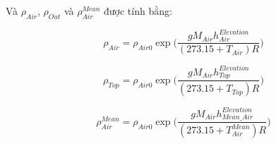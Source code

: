 \documentclass[a4paper]{article}
\begin{document}
Và $\rho_{Air}$, $\rho_{Out}$ và $\rho^{Mean}_{Air}$ được tính bằng:

\begin{equation}\label{rho_air}
\rho_{Air} =  \rho_{Air0}\exp \bigg( \frac{gM_{Air}h^{Elevation}_{Air}}{(273.15+T_{Air})R}\bigg)
\end{equation}

\begin{equation}\label{rho_out}
\rho_{Top} =  \rho_{Air0}\exp \bigg( \frac{gM_{Air}h^{Elevation}_{Top}}{(273.15+T_{Top})R}\bigg)
\end{equation}

\begin{equation}\label{rho_mean}
\rho^{Mean}_{Air} =  \rho_{Air0}\exp \bigg( \frac{gM_{Air}h^{Elevation}_{Mean\_Air}}{(273.15+T^{Mean}_{Air})R}\bigg)
\end{equation}
\end{document}

